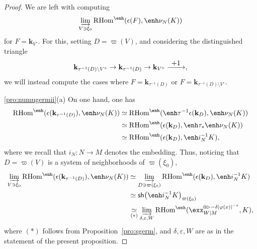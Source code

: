 \documentclass[JEP,XML,SOM,Unicode]{cedram}
\newcommand{\To}[1][]{\mathchoice{\xrightarrow{\textstyle\kern4pt#1\kern3pt}}{\stackrel{#1}{\longrightarrow}}{}{}}
\newcommand{\bl}{\bigl(}
\newcommand{\br}{\bigr)}
\theoremstyle{plain}
\theoremstyle{definition}
\newcommand{\derived}[1]{\mathrm{#1}}
\newcommand{\derr}{\derived{R}}
\newcommand{\RHom}[1][]{\derr\mathrm{Hom}_{\raise1.5ex\hbox to.1em{}#1}}
\newcommand{\FHom}{\RHom^\enh}
\newcommand{\Eopb}[1]{\enh#1^{-1}}
\newcommand{\Eoim}[1]{\enh#1_*}
\newcommand{\Enu}{\enh\nu}
\newcommand{\field}{\mathbf{k}}\let\cor\field
\newcommand{\range}[2]{#1 \mathbin{\rhd} #2}
\newcommand{\sh}{\mathsf{sh}}
\newcommand{\ilim}[1][]{\mathop{\varinjlim}\limits_{#1}}
\begin{document}
\begin{proof}
We are left with computing
\[
\ilim[V\owns\xi_0] \FHom(\epsilon(F),\Enu_N(K))
\]
for
$F=\field_{V^\circ}$.
For this, setting $D=\varpi(V)$, and considering the distinguished triangle
\[
\field_{\tau^{-1}(D)\setminus V^\circ} \to
\field_{\tau^{-1}(D)} \to
\field_{V^\circ} \To[+1],
\]
we will instead compute the cases where
$F=\field_{\tau^{-1}(D)}$ or $F=\field_{\tau^{-1}(D)\setminus V^\circ}$.

\eqref{pro:numugermii}(a)
On one hand, one has
\begin{align*}
\FHom(\epsilon(\field_{\tau^{-1}(D)}),\Enu_N(K))
&\simeq \FHom(\Eopb\tau \epsilon(\field_{D}),\Enu_N(K)) \\
&\simeq \FHom(\epsilon(\field_{D}),\Eoim\tau \Enu_N(K)) \\
&\simeq \FHom(\epsilon(\field_{D}),\Eopb i_N K),
\end{align*}
where we recall that $i_N\colon N\to M$ denotes the embedding.
Thus, noticing that $D=\varpi(V)$ is a system of neighborhoods of $\varpi(\xi_0)$,
\begin{align*}
\ilim[V\owns\xi_0] \FHom(\epsilon(\field_{\tau^{-1}(D)}),\Enu_N(K))
&\simeq \ilim[D\owns \varpi(\xi_0)] \FHom(\epsilon(\field_{D}),\Eopb i_N K) \\
&\simeq \sh\bl\Eopb i_N K\br_{\varpi(\xi_0)} \\
&\underset{(*)}\simeq \ilim[\delta,\varepsilon,W]
\FHom( \exx^{\range0{-\delta|\varphi(x)|^{-\varepsilon}}}_{W|M} , K),
\end{align*}
where $(*)$ follows from Proposition~\ref{pro:sgerm}, and $\delta,\varepsilon,W$ are as in the statement of the present proposition.


\end{proof}
\end{document}

